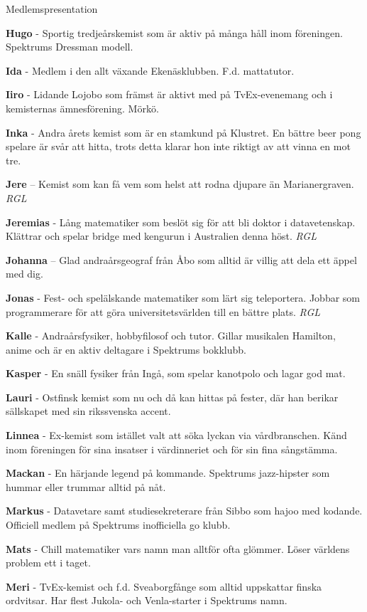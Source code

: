 \documentclass{spektraklet}
\begin{document}
\begin{artikel}{Medlemspresentation}{}
\begin{twocolumns}
\textbf{Hugo} - Sportig tredjeårskemist som är aktiv på många håll inom föreningen. Spektrums Dressman modell.

\textbf{Ida} - Medlem i den allt växande Ekenäsklubben. F.d. mattatutor.

\textbf{Iiro} - Lidande Lojobo som främst är aktivt med på TvEx-evenemang och i kemisternas ämnesförening. Mörkö.

\textbf{Inka} - Andra årets kemist som är en stamkund på Klustret. En bättre beer pong spelare är svår att hitta, trots detta klarar hon inte riktigt av att vinna en mot tre.

\textbf{Jere} – Kemist som kan få vem som helst att rodna djupare än Marianergraven. \emph{RGL}

\textbf{Jeremias} - Lång matematiker som beslöt sig för att bli doktor i datavetenskap. Klättrar och spelar bridge med kengurun i Australien denna höst. \emph{RGL}

\textbf{Johanna} – Glad andraårsgeograf från Åbo som alltid är villig att dela ett äppel med dig.

\textbf{Jonas} - Fest- och spelälskande matematiker som lärt sig teleportera. Jobbar som programmerare för att göra universitetsvärlden till en bättre plats. \emph{RGL}

\textbf{Kalle} - Andraårsfysiker, hobbyfilosof och tutor. Gillar musikalen Hamilton, anime och är en aktiv deltagare i Spektrums bokklubb.

\textbf{Kasper} - En snäll fysiker från Ingå, som spelar kanotpolo och lagar god mat. %

\textbf{Lauri} - Ostfinsk kemist som nu och då kan hittas på fester, där han berikar sällskapet med sin rikssvenska accent.

\textbf{Linnea} - Ex-kemist som istället valt att söka lyckan via vårdbranschen. Känd inom föreningen för sina insatser i värdinneriet och för sin fina sångstämma. %


\textbf{Mackan} - En härjande legend på kommande. Spektrums jazz-hipster som hummar eller trummar alltid på nåt.

\textbf{Markus} - Datavetare samt studiesekreterare från Sibbo som hajoo med kodande. Officiell medlem på Spektrums inofficiella go klubb.

\textbf{Mats} -  Chill matematiker vars namn man alltför ofta glömmer. Löser världens problem ett i taget.

\textbf{Meri} - TvEx-kemist och f.d. Sveaborgfånge som alltid uppskattar finska ordvitsar. Har flest Jukola- och Venla-starter i Spektrums namn.


\end{twocolumns}
\end{artikel}
\end{document}
